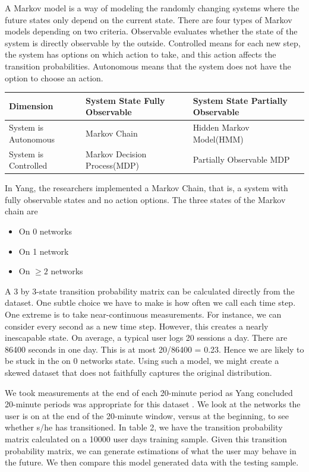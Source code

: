 \documentclass[]{article}
\begin{document}
A Markov model is a way of modeling the randomly changing systems where the future states only depend on the current state. There are four types of Markov models depending on two criteria. Observable evaluates whether the state of the system is directly observable by the outside. Controlled means for each new step, the system has options on which action to take, and this action affects the transition probabilities. Autonomous means that the system does not have the option to choose an action. 

\begin{center}
    \begin{tabular}{| l | l | l |}
    \hline
     Dimension& System State Fully Observable & System State Partially Observable \\ 
    \hline
    System is Autonomous & Markov Chain &Hidden Markov Model(HMM)\\ 
    System is Controlled& Markov Decision Process(MDP) &Partially Observable MDP\\ 
    \hline
    \end{tabular}
\end{center}

In Yang, the researchers implemented a Markov Chain, that is, a system with fully observable states and no action options. The three states of the Markov chain are 

\begin{itemize}
\item
On 0 networks
\item
On 1 network
\item
On $\geq 2$ networks
\end{itemize}

A 3 by 3-state transition probability matrix can be calculated directly from the dataset. One subtle choice we have to make is how often we call each time step. One extreme is to take near-continuous measurements. For instance, we can consider every second as a new time step. However, this creates a nearly inescapable state. On average, a typical user logs 20 sessions a day. There are 86400 seconds in one day. This is at most 20/86400 = 0.23\textperthousand. Hence we are likely to be stuck in the on 0 networks state. Using such a model, we might create a skewed dataset that does not faithfully captures the original distribution.

We took measurements at the end of each 20-minute period as Yang concluded 20-minute periods was appropriate for this dataset \cite{yang}. We look at the networks the user is on at the end of the 20-minute window, versus at the beginning, to see whether s/he has transitioned. In table 2, we have the transition probability matrix calculated on a 10000 user days training sample. Given this transition probability matrix, we can generate estimations of what the user may behave in the future. We then compare this model generated data with the testing sample.
\end{document}
